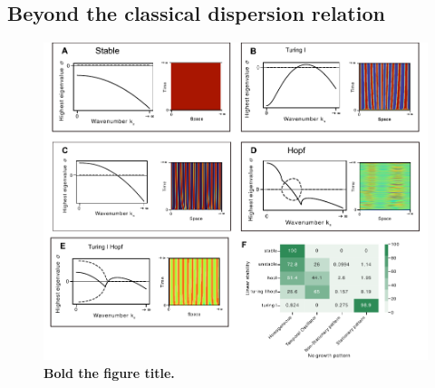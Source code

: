 \documentclass[10pt,letterpaper]{article}
\begin{document}







\subsection*{Beyond the classical dispersion relation}

\begin{figure}[!h]
    \includegraphics[width=1\textwidth]{figures/dispersion}

    \caption{{\bf Bold the figure title.}
        }
    \label{fig4}
\end{figure}
\end{document}
